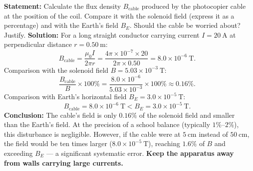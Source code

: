 \documentclass[11pt]{article}
\begin{document}
\begin{exoresolu}
\textbf{Statement:} Calculate the flux density $B_{\text{cable}}$ produced by the photocopier cable at the position of the coil. Compare it with the solenoid field (express it as a percentage) and with the Earth's field $B_E$. Should the cable be worried about? Justify.
\tcblower
\textbf{Solution:}
For a long straight conductor carrying current $I = 20\ \mathrm{A}$ at perpendicular distance $r = 0.50\ \mathrm{m}$:
\[
B_{\text{cable}} = \frac{\mu_0 I}{2\pi r}
= \frac{4\pi \times 10^{-7} \times 20}{2\pi \times 0.50}
= 8.0 \times 10^{-6}\ \mathrm{T}.
\]
Comparison with the solenoid field $B = 5.03 \times 10^{-3}\ \mathrm{T}$:
\[
\frac{B_{\text{cable}}}{B} \times 100\% = \frac{8.0 \times 10^{-6}}{5.03 \times 10^{-3}} \times 100\% \approx 0.16\%.
\]
Comparison with Earth's horizontal field $B_E = 3.0 \times 10^{-5}\ \mathrm{T}$:
\[
B_{\text{cable}} = 8.0 \times 10^{-6}\ \mathrm{T} < B_E = 3.0 \times 10^{-5}\ \mathrm{T}.
\]
\textbf{Conclusion:} The cable's field is only $0.16\%$ of the solenoid field and smaller than the Earth's field. At the precision of a school balance (typically $1\%$--$2\%$), this disturbance is negligible. However, if the cable were at $5\ \mathrm{cm}$ instead of $50\ \mathrm{cm}$, the field would be ten times larger ($8.0 \times 10^{-5}\ \mathrm{T}$), reaching $1.6\%$ of $B$ and exceeding $B_E$ — a significant systematic error. \textbf{Keep the apparatus away from walls carrying large currents.}
\end{exoresolu}
\end{document}
